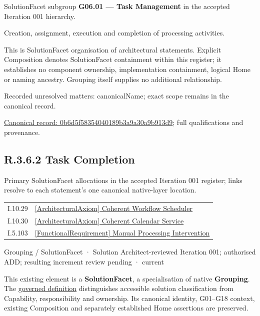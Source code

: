 SolutionFacet subgroup \textbf{G06.01 — Task Management} in the accepted Iteration 001 hierarchy.



Creation, assignment, execution and completion of processing activities.



This is SolutionFacet organisation of architectural statements. Explicit Composition denotes SolutionFacet containment within this register; it establishes no component ownership, implementation containment, logical Home or naming ancestry. Grouping itself supplies no additional relationship.


{\small Recorded unresolved matters: canonicalName; exact scope remains in the canonical record.}\par
{\footnotesize \href{../../../../../../../continuum/grouping/0b6d5f58354040189b3a9a30a9b913d9.md}{Canonical record: 0b6d5f58354040189b3a9a30a9b913d9}; full qualifications and provenance.}\par
\subsection*{R.3.6.2 Task Completion}
\label{navigation:R.3.6.2}

Primary SolutionFacet allocations in the accepted Iteration 001 register; links resolve to each statement’s one canonical native-layer location.\par
\begin{longtable}{p{.22\linewidth}p{.73\linewidth}}
I.10.29 & \hyperref[element:99adfc9b5af049748df91755d395c247]{[ArchitecturalAxiom] Coherent Workflow Scheduler} \\
I.10.30 & \hyperref[element:a9b1d031fa844057aa030f09e4fa6b01]{[ArchitecturalAxiom] Coherent Calendar Service} \\
I.5.103 & \hyperref[element:911511665a8a4135b7f2a37f5f79ad36]{[FunctionalRequirement] Manual Processing Intervention} \\
\end{longtable}
\label{element:2d89b3a1e74e42d28a9f0a3dfb2c4ecb}
{\small Grouping / SolutionFacet · Solution Architect-reviewed Iteration 001; authorised ADD; resulting increment review pending · current}\par

This existing element is a \textbf{SolutionFacet}, a specialisation of native
\textbf{Grouping}. The \href{\detokenize{../../../../../../../governance/continuum-representation.md#solutionfacet-classification--1119-candidate}}{governed definition}
distinguishes accessible solution classification from Capability, responsibility
and ownership. Its canonical identity, G01–G18 context, existing Composition
and separately established Home assertions are preserved.



